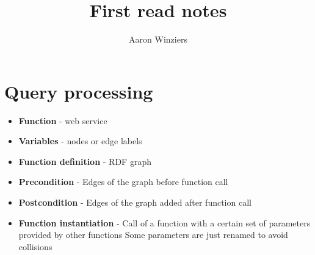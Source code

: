 \documentclass[10pt,a4paper]{article}
\author{Aaron Winziers}
\title{First read notes}
\begin{document}
	\section*{Query processing}
	\begin{itemize}
		\item \textbf{Function} - web service
		\item \textbf{Variables} - nodes or edge labels
		\item \textbf{Function definition} - RDF graph
		\item \textbf{Precondition} - Edges of the graph before function call
		\item \textbf{Postcondition} - Edges of the graph added after function call
		\item \textbf{Function instantiation} - Call of a function with a certain set of parameters provided by other functions
		\subitem Some parameters are just renamed to avoid collisions
		
	\end{itemize}
	
	
\end{document}
